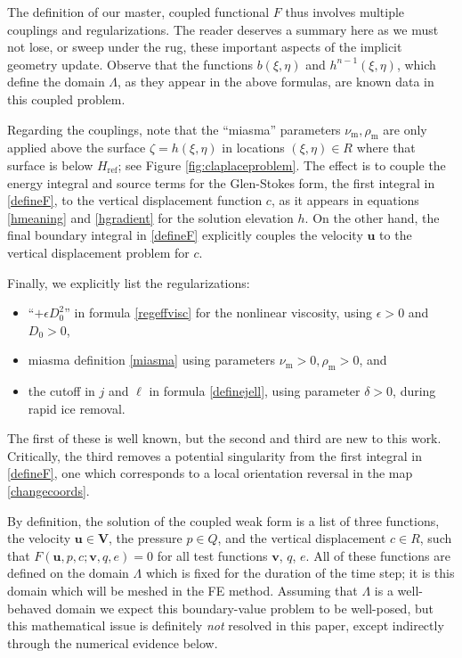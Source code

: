 \documentclass[letterpaper,final,12pt,reqno]{amsart}
\newcommand{\eps}{\epsilon}
\newcommand{\bu}{\mathbf{u}}
\newcommand{\bv}{\mathbf{v}}
\newcommand{\bV}{\mathbf{V}}
\newcommand{\Href}{H_{\text{ref}}}
\newcommand{\num}{\nu_{\text{m}}}
\newcommand{\rhom}{\rho_{\text{m}}}
\begin{document}
The definition of our master, coupled functional $F$ thus involves multiple couplings and regularizations.  The reader deserves a summary here as we must not lose, or sweep under the rug, these important aspects of the implicit geometry update.  Observe that the functions $b(\xi,\eta)$ and $h^{n-1}(\xi,\eta)$, which define the domain $\Lambda$, as they appear in the above formulas, are known data in this coupled problem.

Regarding the couplings, note that the ``miasma'' parameters $\num,\rhom$ are only applied above the surface $\zeta=h(\xi,\eta)$ in locations $(\xi,\eta) \in R$ where that surface is below $\Href$; see Figure \ref{fig:claplaceproblem}.  The effect is to couple the energy integral and source terms for the Glen-Stokes form, the first integral in \eqref{defineF}, to the vertical displacement function $c$, as it appears in equations \eqref{hmeaning} and \eqref{hgradient} for the solution elevation $h$.  On the other hand, the final boundary integral in \eqref{defineF} explicitly couples the velocity $\bu$ to the vertical displacement problem for $c$.

Finally, we explicitly list the regularizations:
\begin{itemize}
\item ``$+\eps D_0^2$'' in formula \eqref{regeffvisc} for the nonlinear viscosity, using $\eps>0$ and $D_0>0$,
\item miasma definition \eqref{miasma} using parameters $\num>0,\rhom>0$, and
\item the cutoff in $j$ and $\ell$ in formula \eqref{definejell}, using parameter $\delta>0$, during rapid ice removal.
\end{itemize}
The first of these is well known, but the second and third are new to this work.  Critically, the third removes a potential singularity from the first integral in \eqref{defineF}, one which corresponds to a local orientation reversal in the map \eqref{changecoords}.

By definition, the solution of the coupled weak form is a list of three functions, the velocity $\bu \in \bV$, the pressure $p\in Q$, and the vertical displacement $c\in R$, such that $F(\bu,p,c;\bv,q,e) = 0$ for all test functions $\bv$, $q$, $e$.  All of these functions are defined on the domain $\Lambda$ which is fixed for the duration of the time step; it is this domain which will be meshed in the FE method.  Assuming that $\Lambda$ is a well-behaved domain we expect this boundary-value problem to be well-posed, but this mathematical issue is definitely \emph{not} resolved in this paper, except indirectly through the numerical evidence below.
\end{document}
